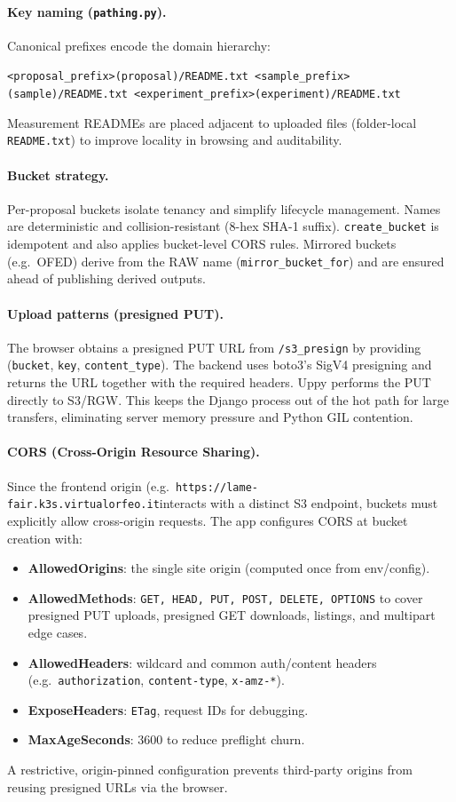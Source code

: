 \paragraph{Key naming (\texttt{pathing.py}).}
Canonical prefixes encode the domain hierarchy:
\begin{center}
	\texttt{<proposal\_prefix>(proposal)/README.txt}\
	\texttt{<sample\_prefix>(sample)/README.txt}\
	\texttt{<experiment\_prefix>(experiment)/README.txt}
\end{center}
Measurement READMEs are placed adjacent to uploaded files (folder-local \texttt{README.txt}) to improve locality in browsing and auditability.

\paragraph{Bucket strategy.}
Per-proposal buckets isolate tenancy and simplify lifecycle management. Names are deterministic and collision-resistant (8-hex SHA-1 suffix). \texttt{create\_bucket} is idempotent and also applies bucket-level CORS rules. Mirrored buckets (e.g.\ OFED) derive from the RAW name (\texttt{mirror\_bucket\_for}) and are ensured ahead of publishing derived outputs.

\paragraph{Upload patterns (presigned PUT).}
The browser obtains a presigned PUT URL from \texttt{/s3\_presign} by providing (\texttt{bucket}, \texttt{key}, \texttt{content\_type}). The backend uses boto3's SigV4 presigning and returns the URL together with the required headers. Uppy performs the PUT directly to S3/RGW. This keeps the Django process out of the hot path for large transfers, eliminating server memory pressure and Python GIL contention.

\paragraph{CORS (Cross-Origin Resource Sharing).}
Since the frontend origin (e.g.\ \texttt{https://lame-fair.k3s.virtualorfeo.it}interacts with a distinct S3 endpoint, buckets must explicitly allow cross-origin requests. The app configures CORS at bucket creation with:
\begin{itemize}
	\item \textbf{AllowedOrigins}: the single site origin (computed once from env/config).
	\item \textbf{AllowedMethods}: {\texttt{GET, HEAD, PUT, POST, DELETE, OPTIONS}} to cover presigned PUT uploads, presigned GET downloads, listings, and multipart edge cases.
	\item \textbf{AllowedHeaders}: wildcard and common auth/content headers (e.g.\ \texttt{authorization}, \texttt{content-type}, \texttt{x-amz-*}).
	\item \textbf{ExposeHeaders}: \texttt{ETag}, request IDs for debugging.
	\item \textbf{MaxAgeSeconds}: 3600 to reduce preflight churn.
\end{itemize}
A restrictive, origin-pinned configuration prevents third-party origins from reusing presigned URLs via the browser.

